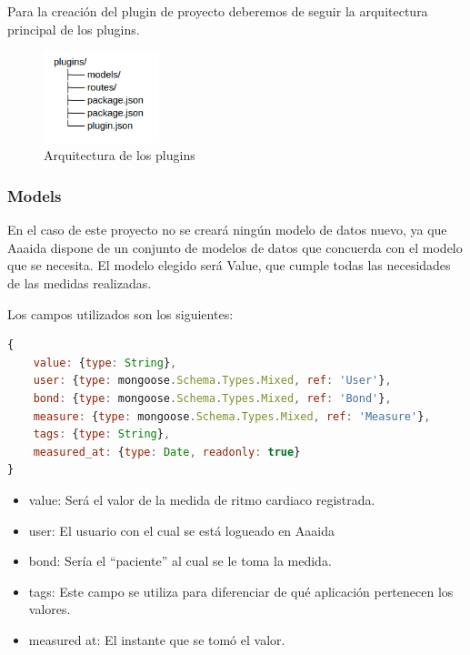 Para la creación del plugin de proyecto deberemos de seguir la arquitectura principal de los plugins.


\begin{figure}[htb]
\begin{center}
\includegraphics[width=0.30\textwidth]{./setup/arc}
\caption{Arquitectura de los plugins}
\end{center}
\end{figure}

\subsubsection{Models}

En el caso de este proyecto no se creará ningún modelo de datos nuevo, ya que Aaaida dispone de un conjunto de modelos de datos que concuerda con el modelo que se necesita. El modelo elegido será Value, que cumple todas las necesidades de las medidas realizadas.
\pagebreak

Los campos utilizados son los siguientes:

\begin{lstlisting}[language=JavaScript]
{
    value: {type: String},
    user: {type: mongoose.Schema.Types.Mixed, ref: 'User'},
    bond: {type: mongoose.Schema.Types.Mixed, ref: 'Bond'},
    measure: {type: mongoose.Schema.Types.Mixed, ref: 'Measure'},
    tags: {type: String},
    measured_at: {type: Date, readonly: true}
}
\end{lstlisting}

\begin{itemize}
\item value: Será el valor de la medida de ritmo cardiaco registrada. 
\item user: El usuario con el cual se está logueado en Aaaida
\item bond: Sería el “paciente” al cual se le toma la medida.
\item tags: Este campo se utiliza para diferenciar de qué aplicación pertenecen los valores.  
\item measured at: El instante que se tomó el valor. 
\end{itemize}

